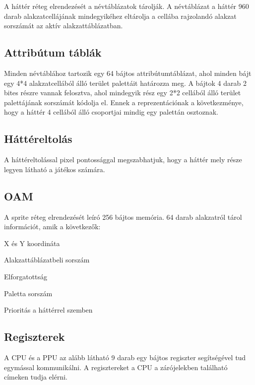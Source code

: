 A háttér réteg elrendezését a névtáblázatok tárolják. A névtáblázat a háttér 960 darab alakzatcellájának mindegyikéhez eltárolja a cellába rajzolandó alakzat sorszámát az aktív alakzattáblázatban.

\subsection{Attribútum táblák}

Minden névtáblához tartozik egy 64 bájtos attribútumtáblázat, ahol minden bájt egy 4*4 alakzatcellából álló terület palettáit határozza meg. A bájtok 4 darab 2 bites részre vannak felosztva, ahol mindegyik rész egy 2*2 cellából álló terület palettájának sorszámát kódolja el. Ennek a reprezentációnak a következménye, hogy a háttér 4 cellából álló csoportjai mindig egy palettán osztoznak.

\subsection{Háttéreltolás}

A háttéreltolással pixel pontossággal megszabhatjuk, hogy a háttér mely része legyen látható a játékos számára. 

\subsection{OAM}

A sprite réteg elrendezését leíró 256 bájtos memória. 64 darab alakzatról tárol információt, amik a következők:

\begin{compactitem}
	\item X és Y koordináta
	\item Alakzattáblázatbeli sorszám
	\item Elforgatottság
	\item Paletta sorszám
	\item Prioritás a háttérrel szemben
\end{compactitem}


\subsection{Regiszterek}

A CPU és a PPU az alább látható 9 darab egy bájtos regiszter segítségével tud egymással kommunikálni. A regisztereket a CPU a zárójelekben található címeken tudja elérni.

\vspace{0.25cm}

